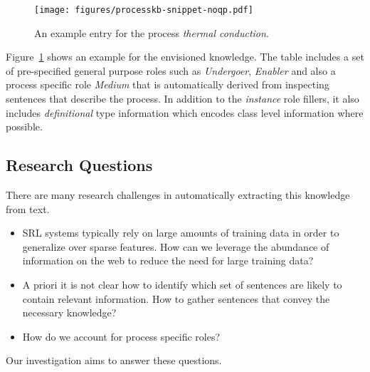 \begin{figure}[hb]
	\begin{center}
	\texttt{[image: figures/processkb-snippet-noqp.pdf]} 	
	\caption{\label{fig:kbsnippet} 
	{An example entry for the process {\em thermal conduction}.}
	}
	\end{center}
\end{figure}

Figure~\ref{fig:kbsnippet} shows an example for the envisioned knowledge. 
The table includes a set of pre-specified general purpose roles such as {\em Undergoer}, {\em Enabler} and also a process specific role {\em Medium} that is automatically derived from inspecting sentences that describe the process. In addition to the {\em instance} role fillers, it also includes {\em definitional} type information which encodes class level information where possible.

\subsection*{Research Questions}

There are many research challenges in automatically extracting this knowledge from text.
\begin{itemize}
\item SRL systems typically rely on large amounts of training data in order to generalize over sparse features. How can we leverage the abundance of information on the web to reduce the need for large training data?
\item A priori it is not clear how to identify which set of sentences are likely to contain relevant information.  How to gather sentences that convey the necessary knowledge? 
\item How do we account for process specific roles? 
\end{itemize}

Our investigation aims to answer these questions. 

